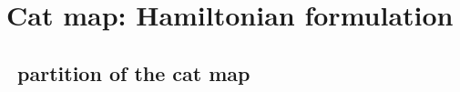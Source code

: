 
\section{Cat map: Hamiltonian formulation}
\label{s:catMapHam}

%
\subsection{\AW\ partition of the cat map \statesp}
\label{s:catAW}

